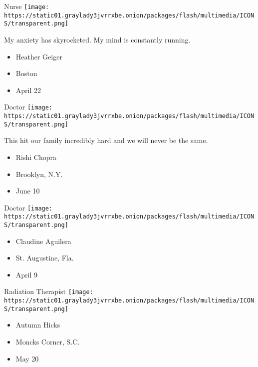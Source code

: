 \protect\hyperlink{item-heather-geiger}{}

Nurse
\texttt{[image: https://static01.graylady3jvrrxbe.onion/packages/flash/multimedia/ICONS/transparent.png]}

My anxiety has skyrocketed. My mind is constantly running.

\begin{itemize}
\tightlist
\item
  Heather Geiger
\item
  Boston
\item
  April 22
\end{itemize}

\protect\hyperlink{item-rishi-chopra}{}

Doctor
\texttt{[image: https://static01.graylady3jvrrxbe.onion/packages/flash/multimedia/ICONS/transparent.png]}

This hit our family incredibly hard and we will never be the same.

\begin{itemize}
\tightlist
\item
  Rishi Chopra
\item
  Brooklyn, N.Y.
\item
  June 10
\end{itemize}

\protect\hyperlink{item-claudine-aguilera}{}

Doctor
\texttt{[image: https://static01.graylady3jvrrxbe.onion/packages/flash/multimedia/ICONS/transparent.png]}

\begin{itemize}
\tightlist
\item
  Claudine Aguilera
\item
  St. Augustine, Fla.
\item
  April 9
\end{itemize}

\protect\hyperlink{item-autumn-hicks}{}

Radiation Therapist
\texttt{[image: https://static01.graylady3jvrrxbe.onion/packages/flash/multimedia/ICONS/transparent.png]}

\begin{itemize}
\tightlist
\item
  Autumn Hicks
\item
  Moncks Corner, S.C.
\item
  May 20
\end{itemize}

\protect\hyperlink{item-joe-berger}{}

